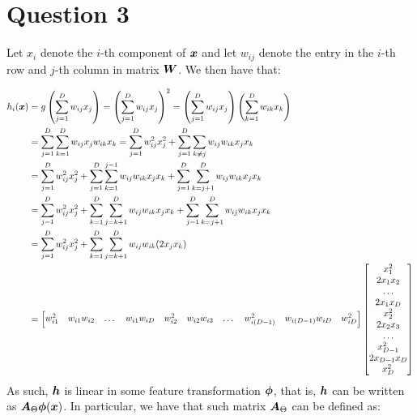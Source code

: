 \documentclass{exam}
\begin{document}
    \section*{Question 3}
    \begin{questions}
        \question
        Let $x_i$ denote the $i$-th component of $\vb*{x}$ and let $w_{ij}$ denote the entry in the $i$-th row and $j$-th column in matrix $\vb*{W}$. We then have that:

        \begin{align*}
            h_i(\vb*{x}) &= g\left(\sum_{j = 1}^{D} w_{ij}x_j \right) = \left(\sum_{j = 1}^{D} w_{ij}x_j \right)^2 = \left(\sum_{j = 1}^{D} w_{ij}x_j\right)\left( \sum_{k = 1}^{D} w_{ik}x_k\right) \\
            &= \sum_{j = 1}^{D} \sum_{k = 1}^{D} w_{ij}x_j  w_{ik}x_k = \sum_{j = 1}^{D} w_{ij}^2x_j^2 +  \sum_{j = 1}^{D} \sum_{k \neq j} w_{ij}w_{ik}x_j x_k \\
            &= \sum_{j = 1}^{D} w_{ij}^2x_j^2 + \sum_{j = 1}^{D} \sum_{k = 1}^{j - 1}  w_{ij}w_{ik}x_j x_k + 
            \sum_{j = 1}^{D} \sum_{k = j + 1}^{D}  w_{ij}w_{ik}x_j x_k \\
            &= \sum_{j = 1}^{D} w_{ij}^2x_j^2 +\sum_{k = 1}^{D} \sum_{j = k + 1}^{D}  w_{ij}w_{ik}x_j x_k + 
            \sum_{j = 1}^{D} \sum_{k = j + 1}^{D}  w_{ij}w_{ik}x_j x_k \\
            &= \sum_{j = 1}^{D} w_{ij}^2x_j^2 + \sum_{k = 1}^{D} \sum_{j = k + 1}^{D} w_{ij}w_{ik}(2x_j x_k) \\
            &= 
            \begin{bmatrix}
                w_{i1}^2 & w_{i1}w_{i2} & \dots & w_{i1}w_{iD} & w_{i2}^2 & w_{i2}w_{i3} & \dots & w_{i(D - 1)}^2  & w_{i(D - 1)} w_{iD} &  w_{iD}^2
            \end{bmatrix}
            \begin{bmatrix}
                x_1^2 \\ 2x_1 x_2 \\ \dots \\ 2x_1 x_D \\ x_2^2 \\ 2x_2 x_3 \\ \dots \\ x_{D - 1}^2 \\ 2x_{D - 1} x_{D} \\  x_{D}^2
            \end{bmatrix}
        \end{align*}
        As such, $\vb*{h}$ is linear in some feature transformation $\vb*{\phi}$, that is, $\vb*{h}$ can be written as $\vb*{A}_{\Theta}\vb*{\phi}(\vb*{x})$. In particular, we have that such matrix $\vb*{A}_{\Theta}$ can be defined as:

\end{questions}
\end{document}
